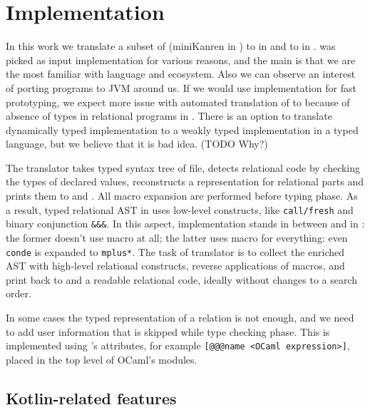 
\section{Implementation}
\label{sec:implementation}

In this work we translate a subset of \OCanren{} (miniKanren in \OCaml{})  to \miniKanren in \Scheme{} and to \Klogic{} in \Kotlin{}.
\OCanren{} was picked as input implementation for various reasons, and the main is that we are the most familiar with \OCaml{} language and ecosystem.
Also we can observe an interest of porting \OCanren{} programs to JVM around us.
If we would use \Scheme{} implementation for fast prototyping, we expect more issue with automated translation of \Scheme{} to \Kotlin{} because of absence of types in relational programs in \Scheme{}.
There is an option to translate dynamically typed implementation to a weakly typed implementation in a typed language, but we believe that it is bad idea. (TODO Why?)

The translator takes typed syntax tree of \OCaml{} file, detects relational code by checking the types of declared values, reconstructs a representation for relational parts and prints them to \Kotlin{} and \Scheme{}.
All macro expansion are performed before typing phase.
As a result, typed relational AST in \OCaml{} uses low-level constructs, like \verb=call/fresh= and binary conjunction \verb=&&&=.
In this aspect, \OCanren{} implementation stands in between \Klogic{} and \miniKanren in \Scheme{}: the former doesn't use macro at all; the latter uses macro for everything: even \verb=conde= is expanded to \verb=mplus*=.
The task of translator is to collect the enriched AST with high-level relational constructs, reverse applications of macros, and print back to \Klogic{} and \Scheme{} a readable relational code, ideally without changes to a search order.

In some cases the typed representation of a relation is not enough, and we need to add user information that is skipped while type checking phase.
This is implemented using \OCaml{}'s attributes, for example \verb=[@@@name <OCaml expression>]=, placed in the top level of OCaml's modules.

\subsection{Kotlin-related features}

